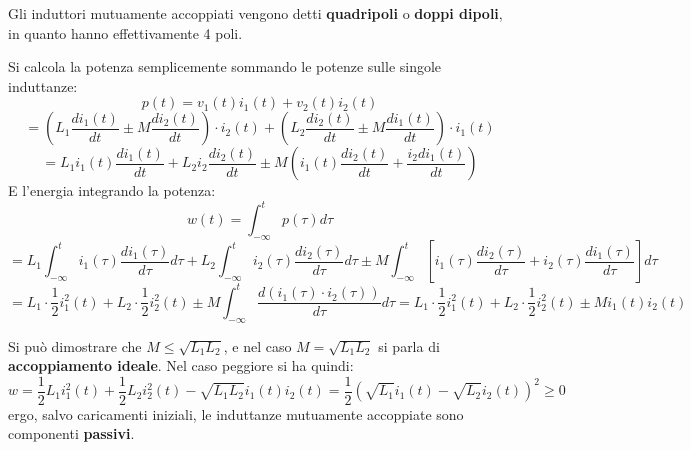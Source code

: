 \documentclass[a4paper,11pt]{article}
\begin{document}
Gli induttori mutuamente accoppiati vengono detti \textbf{quadripoli} o \textbf{doppi dipoli}, in quanto hanno effettivamente 4 poli.

Si calcola la potenza semplicemente sommando le potenze sulle singole induttanze:
$$
p(t) = v_1(t)i_1(t) + v_2(t)i_2(t)  
$$
$$
= \left( L_1 \frac{d i_1(t)}{dt} \pm M \frac{d i_2 (t)}{dt} \right) \cdot i_2(t) +  \left( L_2 \frac{d i_2(t)}{dt} \pm M \frac{d i_1 (t)}{dt} \right) \cdot i_1(t)
$$
$$
= L_1 i_1(t) \frac{d i_1(t)}{dt} + L_2 i_2 \frac{d i_2(t)}{dt} \pm M \left( i_1(t) \frac{d i_2(t)}{dt} + \frac{i_2 d i_1(t)}{dt} \right)
$$
E l'energia integrando la potenza:
$$
w(t) = \int_{-\infty}^t p(\tau) d\tau 
$$
$$
= L_1 \int_{-\infty}^t i_1(\tau) \frac{d i_1 (\tau)}{d\tau}d\tau + L_2 \int_{-\infty}^t i_2(\tau) \frac{d i_2 (\tau)}{d\tau}d\tau \pm M \int_{-\infty}^t \left[ i_1(\tau) \frac{d i_2(\tau)}{d \tau} + i_2(\tau) \frac{d i_1(\tau)}{d \tau} \right] d\tau
$$
$$
= L_1 \cdot \frac{1}{2} i_1^2(t) + L_2 \cdot \frac{1}{2} i_2^2(t) \pm M \int_{-\infty}^t \frac{d(i_1(\tau) \cdot i_2(\tau))}{d\tau}d\tau = L_1 \cdot \frac{1}{2} i_1^2(t) + L_2 \cdot \frac{1}{2} i_2^2(t) \pm M i_1(t)i_2(t) 
$$

Si può dimostrare che $ M \leq \sqrt{L_1 L_2}$, e nel caso $M = \sqrt{L_1 L_2}$ si parla di \textbf{accoppiamento ideale}. Nel caso peggiore si ha quindi:
$$
w = \frac{1}{2} L_1 i_1^2(t) + \frac{1}{2} L_2 i_2^2(t) - \sqrt{L_1 L_2} i_1(t) i_2(t) = \frac{1}{2}\left( \sqrt{L_1} i_1(t) - \sqrt{L_2} i_2(t) \right)^2 \geq 0
$$
ergo, salvo caricamenti iniziali, le induttanze mutuamente accoppiate sono componenti \textbf{passivi}.
\end{document}
